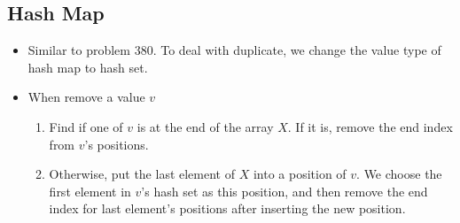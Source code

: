 \subsection{Hash Map}
\begin{itemize}
\item Similar to problem 380. To deal with duplicate, we change the value type of hash map to hash set.
\item When remove a value $v$
\begin{enumerate}
\item Find if one of $v$ is at the end of the array $X$. If it is, remove the end index from $v$'s positions.
\item Otherwise, put the last element of $X$ into a position of $v$. We choose the first element in $v$'s hash set as this position, and then remove the end index for last element's positions after inserting the new position.
\end{enumerate}
\end{itemize}

